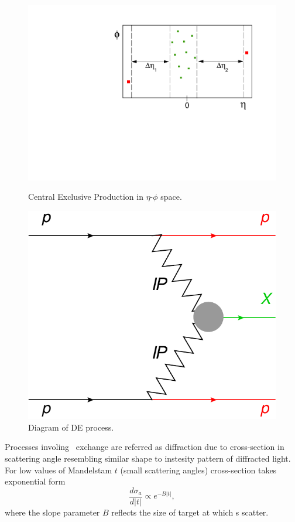 \begin{figure}[b!]
\centering
\parbox{0.475\textwidth}{%
  \centering%
  \hspace*{-10pt}\includegraphics[width=1.1\linewidth]{graphics/introduction/eta_phi.pdf}\vspace*{-10pt}%
  \caption{Central Exclusive Production in $\eta$-$\phi$ space.\\}%
  \label{fig:eta_phi}%
}
\quad
\parbox{0.475\textwidth}{%
  \centering%
  \includegraphics[width=0.64\linewidth]{graphics/introduction/DPE.pdf}%
  \caption{Diagram of D\Pom E process.\\}%
  \label{fig:DPE}%
}\vspace*{-25pt}
\end{figure}

Processes involing \Pomeron\  exchange are referred as diffraction due to cross-section in scattering angle resembling similar shape to instesity pattern of diffracted light. For low values of Mandelstam $t$ (small scattering angles) cross-section takes exponential form\vspace{-10pt}
\begin{equation}
 \frac{d\sigma_{a}}{d|t|} \propto e^{-B|t|},
\end{equation}%
where the slope parameter $B$ reflects the size of target at which \Pomeron s scatter.

